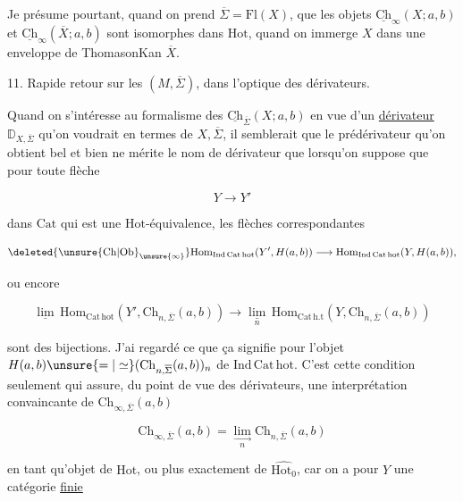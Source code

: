 Je présume pourtant, quand on prend $\overline\Sigma=\mathrm{Fl}(X)$, que les  objets $\underline{\mathrm{Ch}}_\infty(X;a,b)$ et $\underline{\mathrm{Ch}}_\infty(\overline X;a,b)$ \deleted{\unsure{-}} sont   isomorphes dans $\mathrm{Hot}$, quand on immerge $X$ dans une enveloppe de Thomason\unsure{-| }Kan $\overline X$. 


11. Rapide retour  sur les $(M,\overline\Sigma)$, dans l'optique des dérivateurs.

Quand on s'intéresse au formalisme des $\underline{\mathrm{Ch}}_{\overline\Sigma}(X;a,b)$ en vue d'un \uline{dérivateur} $\mathbb D_{X,\overline\Sigma}$ qu'on voudrait  en termes de $X,\overline\Sigma$, il semblerait que le  prédérivateur qu'on obtient bel et bien ne mérite le nom de dérivateur que lorsqu'on suppose que pour toute flèche

\[
Y\longrightarrow Y'
\]

dans $\mathrm{Cat}$ qui est une $\mathrm{Hot}$-équivalence, les flèches correspondantes

\[
\deleted{\unsure{\mathrm{Ch}|\mathrm{Ob}}_{\unsure{\infty}}}\mathrm{Hom}_{\mathrm{Ind\,Cat\,hot}}(Y',H(a,b))\longrightarrow\mathrm{Hom}_{\mathrm{Ind\,Cat\,hot}}(Y,H(a,b)),
\]

ou encore

\[
\underline{\lim}\,\mathrm{Hom}_{\mathrm{Cat\,hot}}(Y',\mathrm{Ch}_{n,\overline\Sigma}(a,b))\longrightarrow
\underset{n}{\underline{\lim}}\,\mathrm{Hom}_{\mathrm{Cat\,h.t}}(Y,\mathrm{Ch}_{n,\overline\Sigma}(a,b))
\]

sont des bijections. J'ai regardé  ce que ça signifie pour l'objet $H(a,b)\unsure{=|\simeq}(\mathrm{Ch}_{n,\overline\Sigma}(a,b))_n$ de $\mathrm{Ind\,Cat\,hot}$. C'est cette condition seulement qui assure, du point de vue des dérivateurs, une interprétation convaincante de $\mathrm{Ch}_{\infty,\overline\Sigma}(a,b)$

\[
\mathrm{Ch}_{\infty,\overline\Sigma}(a,b)=\underset{n}{\underset{\longrightarrow}{\lim}}\mathrm{Ch}_{n,\overline\Sigma}(a,b)
\]

en tant qu'objet de $\mathrm{Hot}$, ou plus exactement de $\widehat{\mathrm{Hot}_0}$, car on a  pour $Y$ une catégorie \uline{finie}

